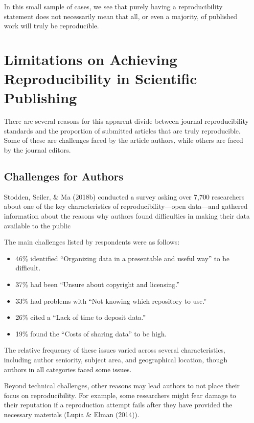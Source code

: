 \documentclass[12pt,twoside]{reedthesis}
\providecommand{\tightlist}{%
  \setlength{\itemsep}{0pt}\setlength{\parskip}{0pt}}
\begin{document}
In this small sample of cases, we see that purely having a reproducibility statement does not necessarily mean that all, or even a majority, of published work will truly be reproducible.

\hypertarget{limitations-on-achieving-reproducibility-in-scientific-publishing}{%
\section{Limitations on Achieving Reproducibility in Scientific Publishing}\label{limitations-on-achieving-reproducibility-in-scientific-publishing}}

There are several reasons for this apparent divide between journal reproducibility standards and the proportion of submitted articles that are truly reproducible. Some of these are challenges faced by the article authors, while others are faced by the journal editors.

\hypertarget{challenges-for-authors}{%
\subsection{Challenges for Authors}\label{challenges-for-authors}}

Stodden, Seiler, \& Ma (2018b) conducted a survey asking over 7,700 researchers about one of the key characteristics of reproducibility---open data---and gathered information about the reasons why authors found difficulties in making their data available to the public

The main challenges listed by respondents were as follows:
\begin{itemize}
\tightlist
\item
  46\% identified ``Organizing data in a presentable and useful way'' to be difficult.
\item
  37\% had been ``Unsure about copyright and licensing.''
\item
  33\% had problems with ``Not knowing which repository to use.''
\item
  26\% cited a ``Lack of time to deposit data.''
\item
  19\% found the ``Costs of sharing data'' to be high.
\end{itemize}
The relative frequency of these issues varied across several characteristics, including author seniority, subject area, and geographical location, though authors in all categories faced some issues.

Beyond technical challenges, other reasons may lead authors to not place their focus on reproducibility. For example, some researchers might fear damage to their reputation if a reproduction attempt fails after they have provided the necessary materials (Lupia \& Elman (2014)).
\end{document}
